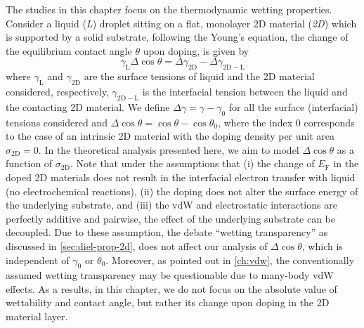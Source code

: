 The studies in this chapter focus on the thermodynamic wetting
properties.
%
Consider a liquid (\emph{L}) droplet sitting on a flat,
monolayer 2D material (\emph{2D}) which is supported by a solid substrate,
following the Young’s equation, the change of the equilibrium contact
angle \(\theta\) upon doping, is given by
\begin{equation}
\label{eqn:wet-def-Young-Delta-theta}
\gamma_{\mathrm{L}} \Delta \cos\theta = \Delta \gamma_{\mathrm{2D}}
                                 - \Delta \gamma_{\mathrm{2D-L}}
\end{equation}
where \(\gamma_{\mathrm{L}}\) and \(\gamma_{\mathrm{2D}}\) are the
surface tensions of liquid and the 2D material considered,
respectively, \(\gamma_{\mathrm{2D-L}}\) is the interfacial tension
between the liquid and the contacting 2D material. We define
\(\Delta \gamma = \gamma - \gamma_{0}\) for all the surface
(interfacial) tensions considered and
\(\Delta \cos \theta = \cos \theta - \cos \theta_{0}\), where the
index 0 corresponds to the case of an intrinsic 2D material with the
doping density per unit area \(\sigma_{\mathrm{2D}} = 0\).
%
In the
theoretical analysis presented here, we aim to model
\(\Delta \cos \theta\) as a function of \(\sigma_{\mathrm{2D}}\). Note
that under the assumptions that (i) the change of \(E_{\mathrm{F}}\)
in the doped 2D materials does not result in the interfacial electron
transfer with liquid (\ie no electro\-chemical reactions), (ii) the doping
does not alter the surface energy of the underlying substrate,
and (iii) the vdW and electrostatic interactions are perfectly
additive and pairwise, the effect of the underlying
substrate can be decoupled.
%
Due to these assumption, the debate “wetting transparency”
\cite{rafiee_2012_transparency,shih_2013_wetting_natmat} as discussed in \autoref{sec:diel-prop-2d}, does not
affect our analysis of \(\Delta \cos \theta\), which is independent of
\(\gamma_{0}\) or \(\theta_{0}\).
%
Moreover, as pointed out in \autoref{ch:vdw}, the conventionally
assumed wetting transparency may be questionable due to many-body vdW
effects. As a results, in this chapter, we do not focus on the
absolute value of wettability and contact angle, but rather its change
upon doping in the 2D material layer.

